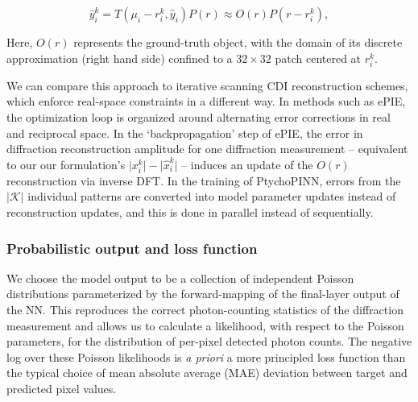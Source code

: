 \documentclass[sn-mathphys]{sn-jnl}%
\theoremstyle{thmstyleone}%
\theoremstyle{thmstyletwo}%
\theoremstyle{thmstylethree}%
\begin{document}
\begin{equation}
\bar{y}_i^k = T(\mu_i - r_i^k, \hat{y}_i) P(r) \approx O(r) P(r - r_i^k),
\label{eq:2}
\end{equation}

Here, $O(r)$ represents the ground-truth object, with the domain of its discrete approximation (right hand side) confined to a $32 \times 32$ patch centered at $r_i^k$.


We can compare this approach to iterative scanning CDI reconstruction schemes, which enforce real-space constraints in a different way. In methods such as ePIE, the optimization loop is organized around alternating error corrections in real and reciprocal space. In the `backpropagation' step of ePIE, the error in diffraction reconstruction amplitude for one diffraction measurement -- equivalent to our our formulation's $\lvert x_i^k \rvert - \lvert \hat{x}_i^k \rvert $ -- induces an update of the $O(r)$ reconstruction via inverse DFT. In the training of PtychoPINN, errors from the $\vert \mathcal{K} \vert$ individual patterns are converted into model parameter updates instead of reconstruction updates, and this is done in parallel instead of sequentially.



\subsubsection{Probabilistic output and loss function}

%

We choose the model output to be a collection of independent Poisson distributions parameterized by the forward-mapping of the final-layer output of the NN. This reproduces the correct photon-counting statistics of the diffraction measurement and allows us to calculate a likelihood, with respect to the Poisson parameters, for the distribution of per-pixel detected photon counts. The negative log over these Poisson likelihoods is \emph{a priori} a more principled loss function than the typical choice of mean absolute average (MAE) deviation between target and predicted pixel values.
\end{document}
